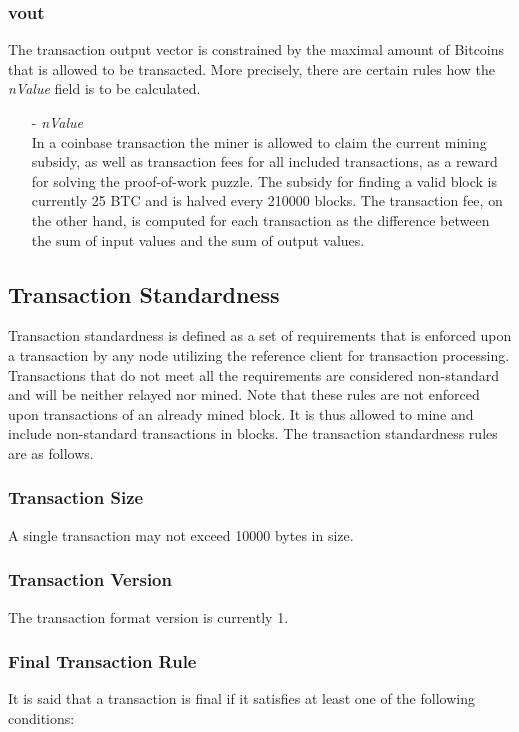 \subsubsection*{vout}
The transaction output vector is constrained by the maximal amount of Bitcoins that is allowed to be transacted. More precisely, there are certain rules how the \textit{nValue} field is to be calculated.

\begin{itemize}
\item[-] \textit{nValue}~\\
In a coinbase transaction the miner is allowed to claim the current mining subsidy, as well as transaction fees for all included transactions, as a reward for solving the proof-of-work puzzle. The subsidy for finding a valid block is currently 25 BTC and is halved every 210000 blocks. The transaction fee, on the other hand, is computed for each transaction as the difference between the sum of input values and the sum of output values.
\end{itemize}


\subsection{Transaction Standardness} \label{sec:TransactionStandardness}
Transaction standardness is defined as a set of requirements that is enforced upon a transaction by any node utilizing the reference client for transaction processing. Transactions that do not meet all the requirements are considered non-standard and will be neither relayed nor mined. Note that these rules are not enforced upon transactions of an already mined block. It is thus allowed to mine and include non-standard transactions in blocks. The transaction standardness rules are as follows.

\subsubsection*{Transaction Size}
A single transaction may not exceed 10000 bytes in size.

\subsubsection*{Transaction Version}
The transaction format version is currently 1.

\subsubsection*{Final Transaction Rule} \label{sec:FinalTransaction}
It is said that a transaction is final if it satisfies at least one of the following conditions:

